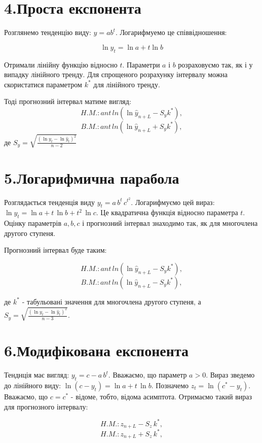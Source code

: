 \documentclass[a4paper, fontsize=10pt, oneside]{article}
\begin{document}
\chapter{\Large \bf 4.Проста експонента} 

Розглянемо тенденцію виду: $y = ab^t$. Логарифмуемо це співвідношення:

$$ \ln{y_{t}} = \ln{a} + t\ln{b}$$

Отримали лінійну функцію відносно $t$. Параметри $a$ і $b$ розраховуємо так, як і у випадку лінійного тренду. Для спрощеного розрахунку інтервалу можна скористатися параметром $k^{*}$ для лінійного тренду.

Тоді прогнозний інтервал матиме вигляд:
$$H.M.:ant \, ln{(\ln{\hat{y}_{n+L}-S_{y}k^{*}})},$$
$$B.M.:ant \, ln{(\ln{\hat{y}_{n+L}+S_{y}k^{*}})},$$
\noindent де $S_{y} = \sqrt{\frac{(\ln{y_{t}} - \ln{\hat{y}_{t}})^2}{n-2}}$

\chapter{\Large \bf 5.Логарифмична парабола}

Розглядається тенденція виду $y_{t} = a\,b^{t}\,c^{t^2}$. Логарифмуємо цей вираз: $\ln{y_{t}} = \ln{a} + t\,\ln{b} + t^2\,\ln{c}$. Це квадратична функція відносно параметра $t$. Оцінку параметрів $a, b, c$ і прогнозний інтервал знаходимо так, як для многочлена другого ступеня.

Прогнозний інтервал буде таким:

$$H.M.:ant \, ln{(\ln{\hat{y}_{n+L}-S_{y}k^{*}})},$$
$$B.M.:ant \, ln{(\ln{\hat{y}_{n+L}-S_{y}k^{*}})},$$

\noindent де $k^{*}$ - табульовані значення для многочлена другого ступеня, а $S_{y} = \sqrt{\frac{(\ln{y_{t}} - \ln{\hat{y}_{t}})^2}{n-3}}.$

\chapter{\Large \bf 6.Модифікована експонента}

Тенднція має вигляд: $y_{t} = c - a\,b^{t}.$ Вважаємо, що параметр $a>0.$ Вираз зведемо до лінійного виду: $\ln{(c - y_{t})} = \ln{ a} + t\,\ln{b}.$ Позначемо $z_{t} = \ln{(c^{*} - y_{t})}.$ Вважаємо, що $c = c^{*}$ - відоме, тобто, відома асимптота. Отримаємо такий вираз для прогнозного інтервалу:

$$H.M.:z_{n+L} - S_{z}\,k^{*},$$
$$H.M.:z_{n+L} + S_{z}\,k^{*},$$
\end{document}
